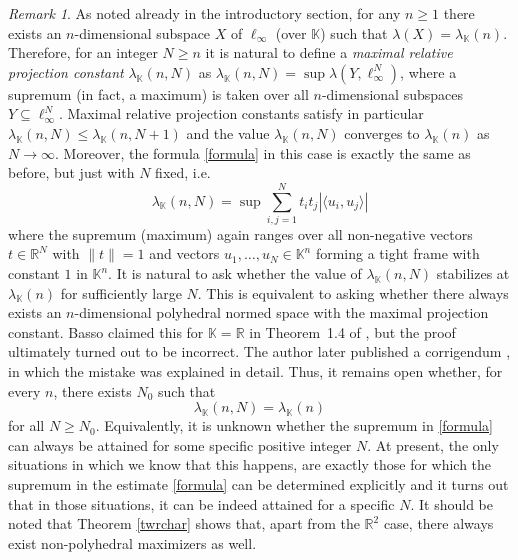 \documentclass[12pt, reqno]{amsart}
\theoremstyle{definition}
\theoremstyle{remark}
\newtheorem{remark}[twr]{Remark}
\numberwithin{equation}{section}
\begin{document}
\begin{remark}
\label{remprojconst}
As noted already in the introductory section, for any $n \geq 1$ there exists an $n$-dimensional subspace $X$ of $\ell_{\infty}$ (over $\mathbb{K}$) such that $\lambda(X) = \lambda_{\mathbb{K}}(n)$. Therefore, for an integer $N \geq n$ it is natural to define a \emph{maximal relative projection constant} $\lambda_{\mathbb{K}}(n, N)$ as $\lambda_{\mathbb{K}}(n, N) = \sup \lambda(Y, \ell_{\infty}^N)$, where a supremum (in fact, a maximum) is taken over all $n$-dimensional subspaces $Y \subseteq \ell_{\infty}^N$. Maximal relative projection constants satisfy in particular $\lambda_{\mathbb{K}}(n, N) \leq \lambda_{\mathbb{K}}(n, N+1)$ and the value $\lambda_{\mathbb{K}}(n, N)$ converges to $\lambda_{\mathbb{K}}(n)$ as $N \to \infty$. Moreover, the formula \eqref{formula} in this case is exactly the same as before, but just with $N$ fixed, i.e.
\begin{equation}
\label{formula2}
\lambda_{\mathbb{K}}(n, N)=  \sup \sum_{i, j=1}^{N} t_i t_j |\langle u_i, u_j \rangle|
\end{equation}
where the supremum (maximum) again ranges over all non-negative vectors $t \in \mathbb{R}^N$ with $\|t\|=1$ and vectors $u_1, \ldots, u_N \in \mathbb{K}^n$ forming a tight frame with constant $1$ in $\mathbb{K}^n$. It is natural to ask whether the value of $\lambda_{\mathbb K}(n,N)$ stabilizes at $\lambda_{\mathbb K}(n)$ for sufficiently large $N$. This is equivalent to asking whether there always exists an $n$-dimensional polyhedral normed space with the maximal projection constant. Basso claimed this for $\mathbb K=\mathbb R$ in Theorem~1.4 of \cite{basso}, but the proof ultimately turned out to be incorrect. The author later published a corrigendum \cite{bassoerratum}, in which the mistake was explained in detail. Thus, it remains open whether, for every $n$, there exists $N_0$ such that \[ \lambda_{\mathbb K}(n,N)=\lambda_{\mathbb K}(n) \] for all $N\ge N_0$. Equivalently, it is unknown whether the supremum in \eqref{formula} can always be attained for some specific positive integer $N$. At present, the only situations in which we know that this happens, are exactly those for which the supremum in the estimate \eqref{formula} can be determined explicitly and it turns out that in those situations, it can be indeed attained for a specific $N$. It should be noted that Theorem \ref{twrchar} shows that, apart from the $\mathbb{R}^2$ case, there always exist non-polyhedral maximizers as well.


\end{remark}
\end{document}
